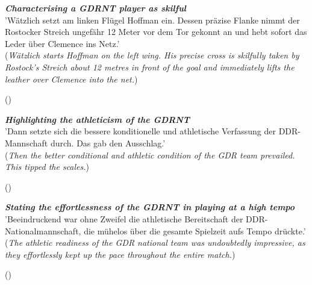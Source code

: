 \begin{displayquote}
\begin{small}
\textbf{\textit{Characterising a GDRNT player as skilful}}\\
'Wätzlich setzt am linken Flügel Hoffman ein. Dessen präzise Flanke nimmt der Rostocker Streich ungefähr 12 Meter vor dem Tor gekonnt an und hebt sofort das Leder über Clemence ins Netz.'\\
(\textit{Wätzlich starts Hoffman on the left wing. His precise cross is skilfully taken by Rostock’s Streich about 12 metres in front of the goal and immediately lifts the leather over Clemence into the net.})\
\begin{flushright}\footnotesize (\cite{nd19740530})\end{flushright}
\end{small}
\end{displayquote}

\begin{displayquote}
\begin{small}
\textbf{\textit{Highlighting the athleticism of the GDRNT}}\\
'Dann setzte sich die bessere konditionelle und athletische Verfassung der DDR-Mannschaft durch. Das gab den Ausschlag.'\\
(\textit{Then the better conditional and athletic condition of the GDR team prevailed. This tipped the scales.})\
\begin{flushright}\footnotesize (\cite{nd19740615})\end{flushright}
\end{small}
\end{displayquote}

\newpage
\begin{displayquote}
\begin{small}
\textbf{\textit{Stating the effortlessness of the GDRNT in playing at a high tempo}}\\
'Beeindruckend war ohne Zweifel die athletische Bereitschaft der DDR-Nationalmannschaft, die mühelos über die gesamte Spielzeit aufs Tempo drückte.'\\
(\textit{The athletic readiness of the GDR national team was undoubtedly impressive, as they effortlessly kept up the pace throughout the entire match.})\
\begin{flushright}\footnotesize (\cite{nd19740615})\end{flushright}
\end{small}
\end{displayquote}

